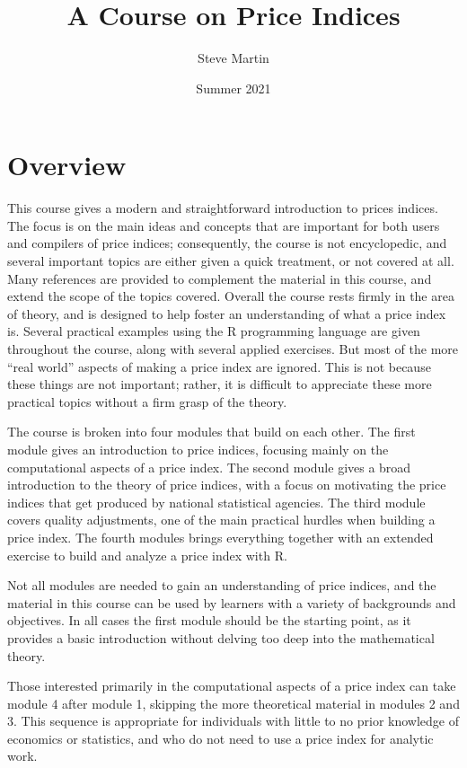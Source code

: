\documentclass[
]{article}
\title{A Course on Price Indices}
\author{Steve Martin}
\date{Summer 2021}
\begin{document}
\maketitle

{
\setcounter{tocdepth}{2}
\tableofcontents
}
\hypertarget{overview}{%
\section*{Overview}\label{overview}}

This course gives a modern and straightforward introduction to prices indices. The focus is on the main ideas and concepts that are important for both users and compilers of price indices; consequently, the course is not encyclopedic, and several important topics are either given a quick treatment, or not covered at all. Many references are provided to complement the material in this course, and extend the scope of the topics covered. Overall the course rests firmly in the area of theory, and is designed to help foster an understanding of what a price index is. Several practical examples using the R programming language are given throughout the course, along with several applied exercises. But most of the more ``real world'' aspects of making a price index are ignored. This is not because these things are not important; rather, it is difficult to appreciate these more practical topics without a firm grasp of the theory.

The course is broken into four modules that build on each other. The first module gives an introduction to price indices, focusing mainly on the computational aspects of a price index. The second module gives a broad introduction to the theory of price indices, with a focus on motivating the price indices that get produced by national statistical agencies. The third module covers quality adjustments, one of the main practical hurdles when building a price index. The fourth modules brings everything together with an extended exercise to build and analyze a price index with R.

Not all modules are needed to gain an understanding of price indices, and the material in this course can be used by learners with a variety of backgrounds and objectives. In all cases the first module should be the starting point, as it provides a basic introduction without delving too deep into the mathematical theory.

Those interested primarily in the computational aspects of a price index can take module 4 after module 1, skipping the more theoretical material in modules 2 and 3. This sequence is appropriate for individuals with little to no prior knowledge of economics or statistics, and who do not need to use a price index for analytic work.
\end{document}
